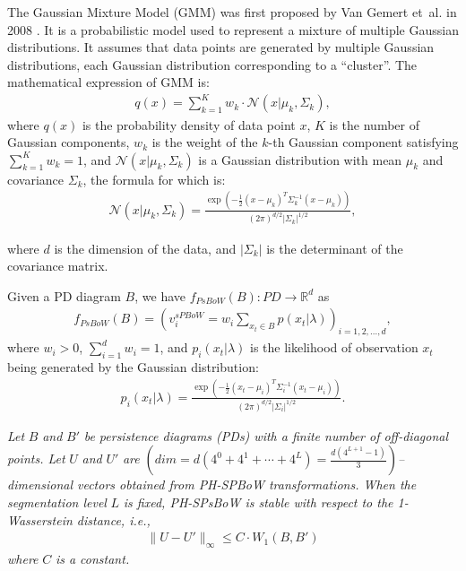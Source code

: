 \documentclass[5GeSdc,ASOC,numref,printGA,printHL,CASflow,nocrossmark,longtitle,PROOF]{/usr/local/texlive/iTemplates/01-Templates/01-Els-Jnl/01-Standard_Templates/V1/ELS_MDL5-V1-6}
\begin{document}
\begin{articlestyle}
The Gaussian Mixture Model (GMM) was first proposed by Van Gemert et~al. in 2008 \cite{van2008kernel}. It is a probabilistic model used to represent a mixture of multiple Gaussian distributions. It assumes that data points are generated by multiple Gaussian distributions, each Gaussian distribution corresponding to a ``cluster''. The mathematical expression of GMM is:
\begin{align*}  
q(x) = \sum_{k=1}^{K} w_k \cdot \mathcal{N}(x | \mu_k, \Sigma_k), 
\end{align*}  
where $ q(x) $ is the probability density of data point $ x $, $ K $ is the number of Gaussian components, $ w_k $ is the weight of the $ k $-th Gaussian component satisfying $ \sum_{k=1}^{K} w_k = 1 $, and $ \mathcal{N}(x | \mu_k, \Sigma_k) $ is a Gaussian distribution with mean $ \mu_k $ and covariance $ \Sigma_k $, the formula for which is:  
\begin{align*}  
\mathcal{N}(x | \mu_k, \Sigma_k) = \frac{\exp\left(-\frac{1}{2} {(x - \mu_k)}^T \Sigma_k^{-1} (x - \mu_k)\right)}{{(2\pi)}^{d/2} |\Sigma_k|^{1/2}}, 
\end{align*}  

\noindent where $ d $ is the dimension of the data, and $ |\Sigma_k| $ is the determinant of the covariance matrix.  

Given a PD diagram $ B $, we have $ f_{PsBoW}(B) : PD \rightarrow \mathbb{R}^d $ as  
\begin{align*}  
f_{PsBoW}(B) = {\left( v^{sPBoW}_i = w_i \sum_{x_t \in B} p(x_t | \lambda) \right)}_{i=1,2,\ldots,d},
\end{align*}  
where $ w_i > 0 $, $ \sum_{i=1}^{d} w_i = 1 $, and $ p_i(x_t | \lambda) $ is the likelihood of observation $ x_t $ being generated by the Gaussian distribution:  
\begin{align*}  
p_i(x_t | \lambda) = \frac{\exp\left(-\frac{1}{2} {(x_t - \mu_i)}^T \Sigma_i^{-1} (x_t - \mu_i)\right)}{{(2\pi)}^{d/2} |\Sigma_i|^{1/2}}.  
\end{align*}  



\begin{theorem}\label{thm2}  
	\textit{Let} $ B $ \textit{and} $ B' $ \textit{be persistence diagrams (PDs) with a finite number of off-diagonal points. Let} $ U $ \textit{and} $ U' $ \textit{are} $\left( dim = d(4^0 + 4^1 + \cdots + 4^L) = \frac{d(4^{L+1} - 1)}{3}\right)$\textit{--dimensional vectors obtained from PH-SPBoW transformations. When the segmentation level} $L$ \textit{is fixed, PH-SPsBoW is stable with respect to the 1-Wasserstein distance, i.e.,}  
	\begin{align*}  
	\| U - U' \|_\infty \leq C \cdot W_1(B, B')  
	\end{align*}  
	\textit{where} $ C $ \textit{is a constant.}    
\end{theorem}  



\end{articlestyle}
\end{document}
